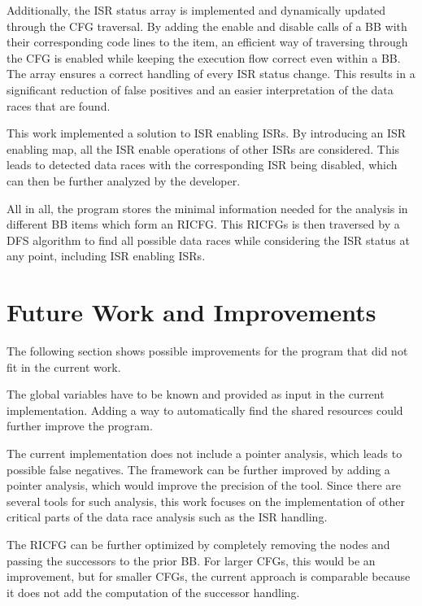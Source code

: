 \documentclass[
fancyheadings, %
%
%
]{stsreprt}
\begin{document}
{Additionally, the \ac{ISR} status array is implemented and dynamically updated through the \ac{CFG} traversal. By adding the enable and disable calls of a \acl{BB} with their corresponding code lines to the item, an efficient way of traversing through the \ac{CFG} is enabled while keeping the execution flow correct even within a \acl{BB}. The array ensures a correct handling of every \ac{ISR} status change. This results in a significant reduction of false positives and an easier interpretation of the data races that are found.

This work implemented a solution to \ac{ISR} enabling \acp{ISR}. By introducing an \ac{ISR} enabling map, all the \ac{ISR} enable operations of other \acp{ISR} are considered. This leads to detected data races with the corresponding \ac{ISR} being disabled, which can then be further analyzed by the developer.

All in all, the program stores the minimal information needed for the analysis in different \acl{BB} items which form an \ac{RICFG}. This \acp{RICFG} is then traversed by a \ac{DFS} algorithm to find all possible data races while considering the \ac{ISR} status at any point, including \ac{ISR} enabling \acp{ISR}.

\section*{Future Work and Improvements}
The following section shows possible improvements for the program that did not fit in the current work.

The global variables have to be known and provided as input in the current implementation. Adding a way to automatically find the shared resources could further improve the program.

The current implementation does not include a pointer analysis, which leads to possible false negatives. The framework can be further improved by adding a pointer analysis, which would improve the precision of the tool. Since there are several tools for such analysis, this work focuses on the implementation of other critical parts of the data race analysis such as the \ac{ISR} handling.

The \ac{RICFG} can be further optimized by completely removing the nodes and passing the successors to the prior \ac{BB}. For larger \acp{CFG}, this would be an improvement, but for smaller \acp{CFG}, the current approach is comparable because it does not add the computation of the successor handling.

}
\end{document}
